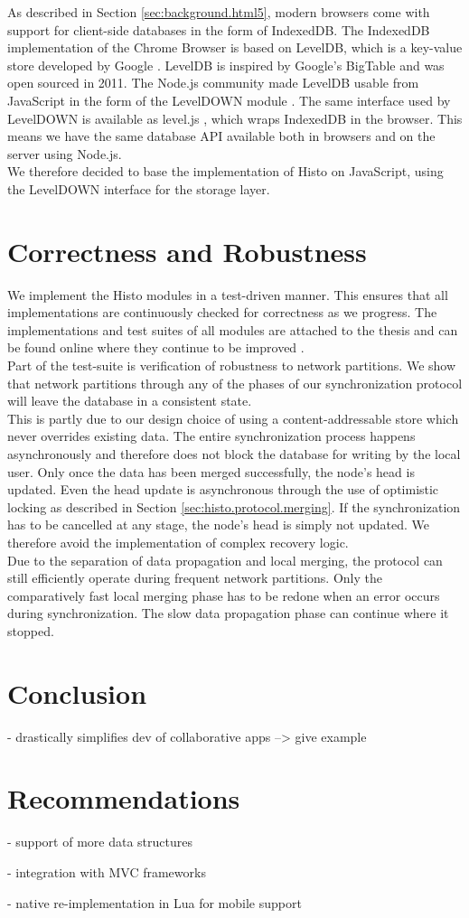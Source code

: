 As described in Section \ref{sec:background.html5}, modern browsers come with support for client-side databases in the form of IndexedDB.
The IndexedDB implementation of the Chrome Browser is based on LevelDB, which is a key-value store developed by Google \cite{leveldb}.
LevelDB is inspired by Google's BigTable \cite{chang2008bigtable} and was open sourced in 2011.
The Node.js community made LevelDB usable from JavaScript in the form of the LevelDOWN module \cite{leveldown}.
The same interface used by LevelDOWN is available as level.js \cite{leveljs}, which wraps IndexedDB in the browser.
This means we have the same database API available both in browsers and on the server using Node.js.\\
We therefore decided to base the implementation of Histo on JavaScript, using the LevelDOWN interface for the storage layer.

\section{Correctness and Robustness}
We implement the Histo modules in a test-driven manner.
This ensures that all implementations are continuously checked for correctness as we progress.
The implementations and test suites of all modules are attached to the thesis and can be found online where they continue to be improved \cite{histo-source}.\\

Part of the test-suite is verification of robustness to network partitions.
We show that network partitions through any of the phases of our synchronization protocol will leave the database in a consistent state.\\
This is partly due to our design choice of using a content-addressable store which never overrides existing data.
The entire synchronization process happens asynchronously and therefore does not block the database for writing by the local user.
Only once the data has been merged successfully, the node's head is updated.
Even the head update is asynchronous through the use of optimistic locking as described in Section \ref{sec:histo.protocol.merging}.
If the synchronization has to be cancelled at any stage, the node's head is simply not updated.
We therefore avoid the implementation of complex recovery logic.\\
Due to the separation of data propagation and local merging, the protocol can still efficiently operate during frequent network partitions.
Only the comparatively fast local merging phase has to be redone when an error occurs during synchronization.
The slow data propagation phase can continue where it stopped.

\section{Conclusion}

- drastically simplifies dev of collaborative apps --> give example

\section{Recommendations}
- support of more data structures

- integration with MVC frameworks

- native re-implementation in Lua for mobile support
